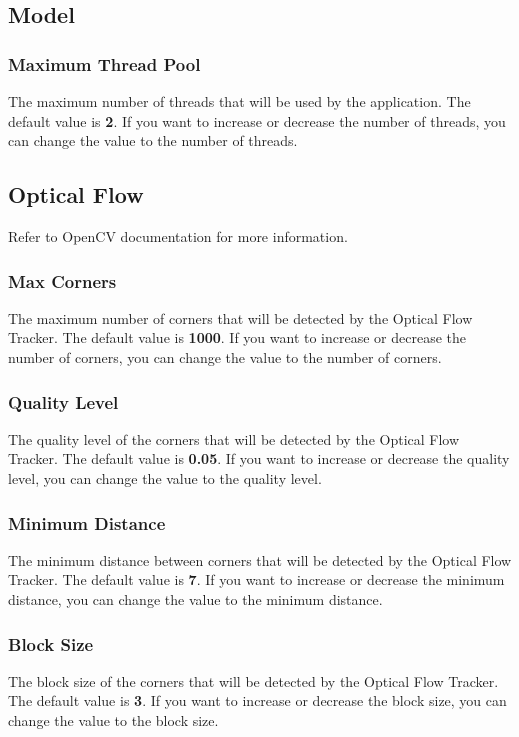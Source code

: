 \subsection{Model}

\subsubsection{Maximum Thread Pool}
The maximum number of threads that will be used by the application. The default value is \textbf{2}. If you want to increase or decrease the number of threads, you can change the value to the number of threads.

\subsection{Optical Flow}

Refer to OpenCV documentation for more information.

\subsubsection{Max Corners}
The maximum number of corners that will be detected by the Optical Flow Tracker. The default value is \textbf{1000}. If you want to increase or decrease the number of corners, you can change the value to the number of corners.

\subsubsection{Quality Level}
The quality level of the corners that will be detected by the Optical Flow Tracker. The default value is \textbf{0.05}. If you want to increase or decrease the quality level, you can change the value to the quality level.

\subsubsection{Minimum Distance}
The minimum distance between corners that will be detected by the Optical Flow Tracker. The default value is \textbf{7}. If you want to increase or decrease the minimum distance, you can change the value to the minimum distance.

\subsubsection{Block Size}
The block size of the corners that will be detected by the Optical Flow Tracker. The default value is \textbf{3}. If you want to increase or decrease the block size, you can change the value to the block size.


